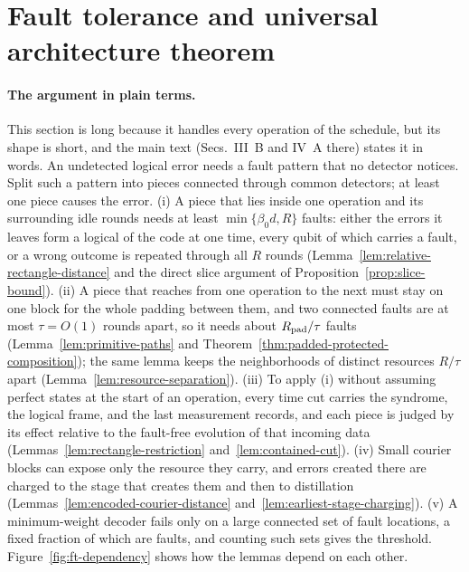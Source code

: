 \documentclass[aps,prx,reprint,superscriptaddress,nofootinbib,floatfix,longbibliography]{revtex4-2}
\theoremstyle{definition}
\begin{document}
\section{Fault tolerance and universal architecture theorem}\label{sec:ft}

\paragraph{The argument in plain terms.}
This section is long because it handles every operation of the schedule, but
its shape is short, and the main text (Secs.~III~B and IV~A there) states it
in words.  An undetected logical error needs a fault pattern that no detector
notices.  Split such a pattern into pieces connected through common
detectors; at least one piece causes the error.  (i) A piece that lies inside
one operation and its surrounding idle rounds needs at least
$\min\{\beta_0d,R\}$ faults: either the errors it leaves form a logical of
the code at one time, every qubit of which carries a fault, or a wrong
outcome is repeated through all $R$ rounds
(Lemma~\ref{lem:relative-rectangle-distance} and the direct slice argument of
Proposition~\ref{prop:slice-bound}).  (ii) A piece that reaches from one
operation to the next must stay on one block for the whole padding between
them, and two connected faults are at most $\tau=O(1)$ rounds apart, so it
needs about $R_{\rm pad}/\tau$ faults (Lemma~\ref{lem:primitive-paths} and
Theorem~\ref{thm:padded-protected-composition}); the same lemma keeps the
neighborhoods of distinct resources $R/\tau$ apart
(Lemma~\ref{lem:resource-separation}).
(iii) To apply (i) without assuming perfect states at the start of an
operation, every time cut carries the syndrome, the logical frame, and the
last measurement records, and each piece is judged by its effect relative to
the fault-free evolution of that incoming data
(Lemmas~\ref{lem:rectangle-restriction} and~\ref{lem:contained-cut}).
(iv) Small courier blocks can expose only the resource they carry, and errors
created there are charged to the stage that creates them and then to
distillation (Lemmas~\ref{lem:encoded-courier-distance}
and~\ref{lem:earliest-stage-charging}).  (v) A minimum-weight decoder fails
only on a large connected set of fault locations, a fixed fraction of which
are faults, and counting such sets gives the threshold.
Figure~\ref{fig:ft-dependency} shows how the lemmas depend on each other.

\begin{center}
\end{center}
\end{document}

